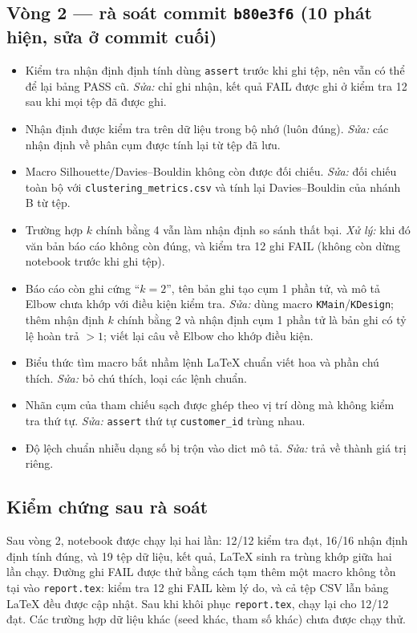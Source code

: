 \documentclass[11pt,a4paper]{article}
\begin{document}
\subsection*{Vòng 2 — rà soát commit \texttt{b80e3f6} (10 phát hiện, sửa ở commit cuối)}
\begin{itemize}
  \item Kiểm tra nhận định định tính dùng \texttt{assert} trước khi ghi tệp, nên vẫn có thể để lại bảng PASS cũ. \emph{Sửa:} chỉ ghi nhận, kết quả FAIL được ghi ở kiểm tra 12 sau khi mọi tệp đã được ghi.
  \item Nhận định được kiểm tra trên dữ liệu trong bộ nhớ (luôn đúng). \emph{Sửa:} các nhận định về phân cụm được tính lại từ tệp đã lưu.
  \item Macro Silhouette/Davies–Bouldin không còn được đối chiếu. \emph{Sửa:} đối chiếu toàn bộ với \texttt{clustering\_metrics.csv} và tính lại Davies–Bouldin của nhánh B từ tệp.
  \item Trường hợp $k$ chính bằng 4 vẫn làm nhận định so sánh thất bại. \emph{Xử lý:} khi đó văn bản báo cáo không còn đúng, và kiểm tra 12 ghi FAIL (không còn dừng notebook trước khi ghi tệp).
  \item Báo cáo còn ghi cứng ``$k=2$'', tên bản ghi tạo cụm 1 phần tử, và mô tả Elbow chưa khớp với điều kiện kiểm tra. \emph{Sửa:} dùng macro \texttt{KMain}/\texttt{KDesign}; thêm nhận định $k$ chính bằng 2 và nhận định cụm 1 phần tử là bản ghi có tỷ lệ hoàn trả $>1$; viết lại câu về Elbow cho khớp điều kiện.
  \item Biểu thức tìm macro bắt nhầm lệnh LaTeX chuẩn viết hoa và phần chú thích. \emph{Sửa:} bỏ chú thích, loại các lệnh chuẩn.
  \item Nhãn cụm của tham chiếu sạch được ghép theo vị trí dòng mà không kiểm tra thứ tự. \emph{Sửa:} \texttt{assert} thứ tự \texttt{customer\_id} trùng nhau.
  \item Độ lệch chuẩn nhiễu dạng số bị trộn vào dict mô tả. \emph{Sửa:} trả về thành giá trị riêng.
\end{itemize}

\subsection*{Kiểm chứng sau rà soát}
Sau vòng 2, notebook được chạy lại hai lần: 12/12 kiểm tra đạt, 16/16 nhận định định tính đúng, và 19 tệp dữ liệu, kết quả, LaTeX sinh ra trùng khớp giữa hai lần chạy. Đường ghi FAIL được thử bằng cách tạm thêm một macro không tồn tại vào \texttt{report.tex}: kiểm tra 12 ghi FAIL kèm lý do, và cả tệp CSV lẫn bảng LaTeX đều được cập nhật. Sau khi khôi phục \texttt{report.tex}, chạy lại cho 12/12 đạt. Các trường hợp dữ liệu khác (seed khác, tham số khác) chưa được chạy thử.
\end{document}
